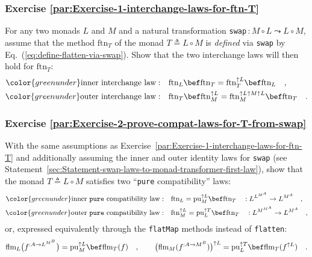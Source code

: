 \subsubsection{Exercise \label{par:Exercise-1-interchange-laws-for-ftn-T}\ref{par:Exercise-1-interchange-laws-for-ftn-T}}

For any two monads $L$ and $M$ and a natural transformation \lstinline!swap!$\,:M\circ L\leadsto L\circ M$,
assume that the method $\text{ftn}_{T}$ of the monad $T\triangleq L\circ M$
is \emph{defined} via \lstinline!swap! by Eq.~(\ref{eq:define-flatten-via-swap}).
Show that the two interchange laws will then hold for $\text{ftn}_{T}$:
\begin{align*}
{\color{greenunder}\text{inner interchange law}:}\quad & \text{ftn}_{L}\bef\text{ftn}_{T}=\text{ftn}_{T}^{\uparrow L}\bef\text{ftn}_{L}\quad,\\
{\color{greenunder}\text{outer interchange law}:}\quad & \text{ftn}_{T}\bef\text{ftn}_{M}^{\uparrow L}=\text{ftn}_{M}^{\uparrow L\uparrow M\uparrow L}\bef\text{ftn}_{T}\quad.
\end{align*}


\subsubsection{Exercise \label{par:Exercise-2-prove-compat-laws-for-T-from-swap}\ref{par:Exercise-2-prove-compat-laws-for-T-from-swap}}

With the same assumptions as Exercise~\ref{par:Exercise-1-interchange-laws-for-ftn-T}
and additionally assuming the inner and outer identity laws for \lstinline!swap!
(see Statement~\ref{sec:Statement-swap-laws-to-monad-transformer-first-law}),
show that the monad $T\triangleq L\circ M$ satisfies two \textsf{``}\lstinline!pure!
compatibility\textsf{''} laws:
\begin{align*}
{\color{greenunder}\text{inner \texttt{pure} compatibility law}:}\quad & \text{ftn}_{L}=\text{pu}_{M}^{\uparrow L}\bef\text{ftn}_{T}\quad:L^{L^{M^{A}}}\rightarrow L^{M^{A}}\quad,\\
{\color{greenunder}\text{outer \texttt{pure} compatibility law}:}\quad & \text{ftn}_{M}^{\uparrow L}=\text{pu}_{L}^{\uparrow T}\bef\text{ftn}_{T}\quad:L^{M^{M^{A}}}\rightarrow L^{M^{A}}\quad,
\end{align*}
or, expressed equivalently through the \lstinline!flatMap! methods
instead of \lstinline!flatten!:
\[
\text{flm}_{L}\big(f^{:A\rightarrow L^{M^{B}}}\big)=\text{pu}_{M}^{\uparrow L}\bef\text{flm}_{T}(f)\quad,\quad\quad\big(\text{flm}_{M}(f^{:A\rightarrow M^{B}})\big)^{\uparrow L}=\text{pu}_{L}^{\uparrow T}\bef\text{flm}_{T}(f^{\uparrow L})\quad.
\]


